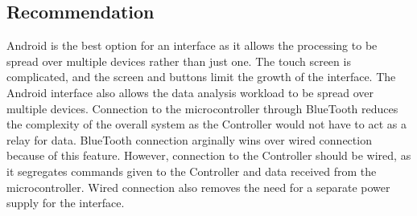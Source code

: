 \documentclass[draftclsnofoot,onecolumn,letterpaper,10pt]{IEEEtran}
\begin{document}
\subsection{Recommendation}
Android is the best option for an interface as it allows the processing to be spread over multiple devices rather than just one.
The touch screen is complicated, and the screen and buttons limit the growth of the interface.
The Android interface also allows the data analysis workload to be spread over multiple devices.
Connection to the microcontroller through BlueTooth reduces the complexity of the overall system as the Controller would not have to act as a relay for data.
BlueTooth connection arginally wins over wired connection because of this feature.
However, connection to the Controller should be wired, as it segregates commands given to the Controller and data received from the microcontroller.
Wired connection also removes the need for a separate power supply for the interface.



\end{document}
